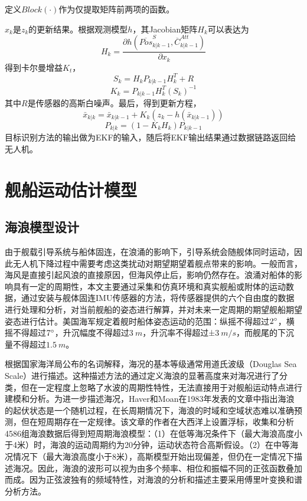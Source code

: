 定义$Block(\cdot)$作为仅提取矩阵前两项的函数。

$x_k$是$z_k$的更新结果。根据观测模型$h$，其Jacobian矩阵$H_k$可以表达为
\begin{equation}
H_k=\frac{\partial h ( \overline{Pos}^S_{k|k-1}, \overline{C}^{Att}_{k|k-1} )}{\partial x_k} 
\end{equation}
得到卡尔曼增益$K_t$，
\begin{equation}
S_k=H_k P_{k|k-1} H^T_k + R
\end{equation}
\begin{equation}
K_k=P_{k|k-1}H^T_k(S_k)^{-1}
\end{equation}
其中$R$是传感器的高斯白噪声。最后，得到更新方程，
\begin{equation}
\bar{x}_{k|k} = \bar{x}_{k|k-1}+K_k(z_k-h(\bar{x}_{k|k-1}))
\end{equation}
\begin{equation}
P_{k|k}=(1-K_k H_k)P_{k|k-1}
\end{equation}
目标识别方法的输出做为EKF的输入，随后将EKF输出结果通过数据链路返回给无人机。

\section{舰船运动估计模型}
\subsection{海浪模型设计}
由于舰载引导系统与船体固连，在浪涌的影响下，引导系统会随舰体同时运动，因此无人机下降过程中需要考虑这类扰动对期望期望着舰点带来的影响。一般而言，海风是直接引起风浪的直接原因，但海风停止后，影响仍然存在。浪涌对船体的影响具有一定的周期性，本文主要通过采集和仿真环境和真实舰船或附体的运动数据，通过安装与舰体固连IMU传感器的方法，将传感器提供的六个自由度的数据进行处理和分析，对当前舰船的姿态进行解算，并对未来一定周期的期望舰船期望姿态进行估计。美国海军规定着舰时船体姿态运动的范围：纵摇不得超过$2\degree$，横摇不得超过$7\degree$，升沉幅度不得超过$3\ m$，升沉率不得超过±$3\ m/s$，而舰尾的下沉量不得超过$1.5\ m$。

根据国家海洋局公布的名词解释，海况的基本等级通常用道氏波级（Douglas Sea Scale）进行描述\cite{sea_state}。这种描述方法的通过定义海浪的显著高度来对海况进行了分类，但在一定程度上忽略了水波的周期性特性，无法直接用于对舰船运动特点进行建模和分析。为进一步描述海况，Haver和Moan在1983年发表的文章\cite{haver1983some}中指出海浪的起伏状态是一个随机过程，在长周期情况下，海浪的时域和空域状态难以准确预测，但在短周期存在一定规律。该文章的作者在大西洋上设置浮标，收集和分析4586组海浪数据后得到短周期海浪模型：（1）在低等海况条件下（最大海浪高度小于4米）时，海浪的运动周期约为20分钟，运动状态符合高斯假设。（2）在中等海况情况下（最大海浪高度小于8米），高斯模型开始出现偏差，但仍在一定情况下描述海况。因此，海浪的波形可以视为由多个频率、相位和振幅不同的正弦函数叠加而成。因为正弦波独有的频域特性，对海浪的分析和描述主要采用傅里叶变换和谱分析方法。


